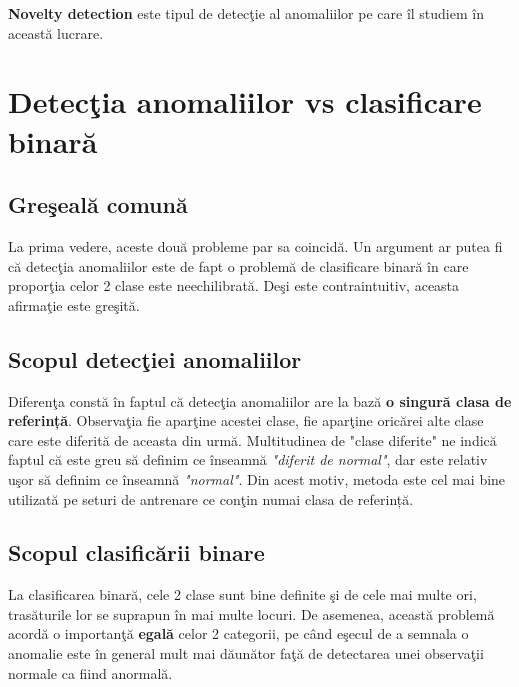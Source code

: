 \textbf{Novelty detection} este tipul de detecţie al anomaliilor pe care îl studiem în 
această lucrare.

\section{Detecţia anomaliilor vs clasificare binară}

\subsection{Greşeală comună}

La prima vedere, aceste două probleme par sa coincidă. Un argument ar putea fi că 
detecţia anomaliilor este de fapt o problemă de clasificare binară în care proporţia
celor 2 clase este neechilibrată. Deşi este contraintuitiv, aceasta 
afirmaţie este greşită.

\subsection{Scopul detecţiei anomaliilor}

Diferenţa constă în faptul că detecţia anomaliilor are la bază \textbf{o singură clasa
de referință}. Observaţia fie aparţine acestei clase, fie aparţine oricărei alte clase 
care este diferită de aceasta din urmă. Multitudinea de "clase diferite" ne indică
faptul că este greu să definim ce înseamnă \textit{"diferit de normal"}, dar este relativ uşor
să definim ce înseamnă \textit{"normal"}.
Din acest motiv, 
metoda este cel mai bine utilizată pe seturi de antrenare ce conţin numai clasa de 
referință.

\subsection{Scopul clasificării binare}

La clasificarea binară, cele 2 clase sunt bine 
definite şi de cele mai multe ori, trasăturile lor se suprapun în mai multe locuri. De 
asemenea, această problemă acordă o importanţă \textbf{egală} celor 2 categorii, pe când
eşecul de a semnala o anomalie este în general mult mai dăunător faţă de 
detectarea unei observaţii normale ca fiind anormală. 

